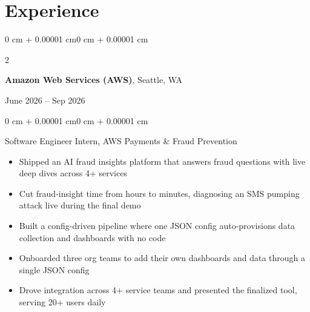 \documentclass[11pt, letterpaper]{article}
\newenvironment{highlights}{
    \begin{itemize}[
        topsep=0.06 cm,
        parsep=0.06 cm,
        partopsep=0pt,
        itemsep=0pt,
        leftmargin=0 cm + 10pt
    ]
}{\end{itemize}}
\newenvironment{onecolentry}{
    \begin{adjustwidth}{0 cm + 0.00001 cm}{0 cm + 0.00001 cm}
}{\end{adjustwidth}}
\newenvironment{bodyonecolentry}{
    \begin{onecolentry}\small
}{\end{onecolentry}}
\newenvironment{twocolentry}[2][]{
    \onecolentry
    \def\secondColumn{#2}
    \setcolumnwidth{\fill, 4.5 cm}
    \begin{paracol}{2}
}{
    \switchcolumn \raggedleft \secondColumn
    \end{paracol}
    \endonecolentry
}
\begin{document}
    \section{Experience}

    \begin{twocolentry}{June 2026 -- Sep 2026}
        \textbf{Amazon Web Services (AWS)}, Seattle, WA
    \end{twocolentry}
    \vspace{0.08 cm}
    \begin{bodyonecolentry}
        Software Engineer Intern, AWS Payments \& Fraud Prevention
        \begin{highlights}
            \item Shipped an AI fraud insights platform that answers fraud questions with live deep dives across 4+ services
            \item Cut fraud-insight time from hours to minutes, diagnosing an SMS pumping attack live during the final demo
            \item Built a config-driven pipeline where one JSON config auto-provisions data collection and dashboards with no code
            \item Onboarded three org teams to add their own dashboards and data through a single JSON config
            \item Drove integration across 4+ service teams and presented the finalized tool, serving 20+ users daily
        \end{highlights}
    \end{bodyonecolentry}

    \vspace{0.12 cm}
\end{document}

